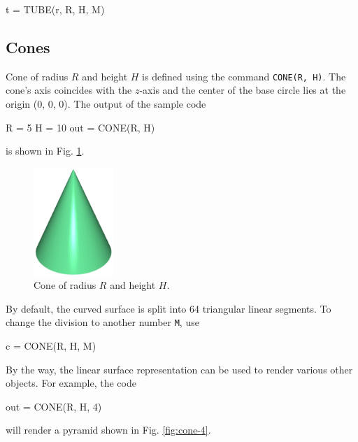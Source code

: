 \begin{bluecode}
t = TUBE(r, R, H, M)
\end{bluecode}

\subsection{Cones}\label{par:coco}

Cone of radius $R$ and height $H$ is defined using the command 
{\tt CONE(R, H)}. The cone's axis coincides with the $z$-axis and 
the center of the base circle lies at the origin (0, 0, 0).
The output of the sample code

\begin{bluecode}
R = 5
H = 10
out = CONE(R, H)
\end{bluecode}
\noindent
is shown in Fig. \ref{fig:convexhull-2a}.
\newpage

\begin{figure}[!ht]
\begin{center}
\includegraphics[width=0.27\textwidth]{img/convexhull-2.png}
\end{center}
\vspace{-4mm}
\caption{Cone of radius $R$ and height $H$.}
\label{fig:convexhull-2a}
\end{figure}
\noindent
By default, the curved surface is split into 64 triangular linear segments. To 
change the division to another number {\tt M}, use

\begin{bluecode}
c = CONE(R, H, M)
\end{bluecode}
By the way, the linear surface representation can be used 
to render various other objects. For example, the code 

\begin{bluecode}
out = CONE(R, H, 4)
\end{bluecode}
will render a pyramid shown in Fig. \ref{fig:cone-4}.

